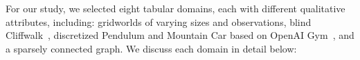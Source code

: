 








For our study, we selected eight tabular domains, each with different qualitative attributes, including: gridworlds of varying sizes and observations, blind Cliffwalk~\citep{Schaul2015}, discretized Pendulum and Mountain Car based on OpenAI Gym~\citep{gym},
and a sparsely connected graph. We discuss each domain in detail below:

